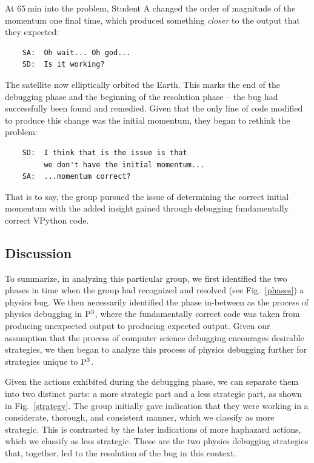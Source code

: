 \documentclass{msuphddissertation}
\begin{document}
\begin{doublespace}
At $\SI{65}{\minute}$ into the problem, Student A changed the order of magnitude of the momentum one final time, which produced something \emph{closer} to the output that they expected:  \begin{verbatim}
    SA:  Oh wait... Oh god...
    SD:  Is it working?
\end{verbatim}  The satellite now elliptically orbited the Earth.  This marks the end of the debugging phase and the beginning of the resolution phase -- the bug had successfully been found and remedied.  Given that the only line of code modified to produce this change was the initial momentum, they began to rethink the problem:  \begin{verbatim}
    SD:  I think that is the issue is that
         we don't have the initial momentum...
    SA:  ...momentum correct?
\end{verbatim}  That is to say, the group pursued the issue of determining the correct initial momentum with the added insight gained through debugging fundamentally correct VPython code.

\subsection{Discussion}

To summarize, in analyzing this particular group, we first identified the two phases in time when the group had recognized and resolved (see Fig.~\ref{phases}) a physics bug.  We then necessarily identified the phase in-between as the process of physics debugging in ${\rm P}^{3}$, where the fundamentally correct code was taken from producing unexpected output to producing expected output.  Given our assumption that the process of computer science debugging encourages desirable strategies, we then began to analyze this process of physics debugging further for strategies unique to ${\rm P}^{3}$.

Given the actions exhibited during the debugging phase, we can separate them into two distinct parts: a more strategic part and a less strategic part, as shown in Fig.~\ref{strategy}.  The group initially gave indication that they were working in a considerate, thorough, and consistent manner, which we classify as more strategic.  This is contrasted by the later indications of more haphazard actions, which we classify as less strategic.  These are the two physics debugging strategies that, together, led to the resolution of the bug in this context.


\end{doublespace}
\end{document}
